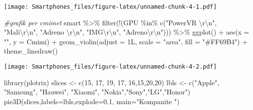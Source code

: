 \documentclass[
]{article}
\newenvironment{Shaded}{\begin{snugshade}}{\end{snugshade}}
\newcommand{\AttributeTok}[1]{\textcolor[rgb]{0.77,0.63,0.00}{#1}}
\newcommand{\CommentTok}[1]{\textcolor[rgb]{0.56,0.35,0.01}{\textit{#1}}}
\newcommand{\DecValTok}[1]{\textcolor[rgb]{0.00,0.00,0.81}{#1}}
\newcommand{\FloatTok}[1]{\textcolor[rgb]{0.00,0.00,0.81}{#1}}
\newcommand{\FunctionTok}[1]{\textcolor[rgb]{0.00,0.00,0.00}{#1}}
\newcommand{\NormalTok}[1]{#1}
\newcommand{\OtherTok}[1]{\textcolor[rgb]{0.56,0.35,0.01}{#1}}
\newcommand{\SpecialCharTok}[1]{\textcolor[rgb]{0.00,0.00,0.00}{#1}}
\newcommand{\StringTok}[1]{\textcolor[rgb]{0.31,0.60,0.02}{#1}}
\begin{document}
\texttt{[image: Smartphones\_files/figure-latex/unnamed-chunk-4-1.pdf]}

\begin{Shaded}
\begin{Highlighting}[]
\CommentTok{\#grafik per cmimet}
\NormalTok{smart }\SpecialCharTok{\%\textgreater{}\%}
 \FunctionTok{filter}\NormalTok{(}\SpecialCharTok{!}\NormalTok{(GPU }\SpecialCharTok{\%in\%} \FunctionTok{c}\NormalTok{(}\StringTok{"PowerVR }\SpecialCharTok{\textbackslash{}r\textbackslash{}n}\StringTok{"}\NormalTok{, }\StringTok{"Mali}\SpecialCharTok{\textbackslash{}r\textbackslash{}n}\StringTok{"}\NormalTok{, }\StringTok{"Adreno }\SpecialCharTok{\textbackslash{}r\textbackslash{}n}\StringTok{"}\NormalTok{, }\StringTok{"IMG}\SpecialCharTok{\textbackslash{}r\textbackslash{}n}\StringTok{"}\NormalTok{, }\StringTok{"Adreno}\SpecialCharTok{\textbackslash{}r\textbackslash{}n}\StringTok{"}\NormalTok{))) }\SpecialCharTok{\%\textgreater{}\%}
 \FunctionTok{ggplot}\NormalTok{() }\SpecialCharTok{+}
  \FunctionTok{aes}\NormalTok{(}\AttributeTok{x =} \StringTok{""}\NormalTok{, }\AttributeTok{y =}\NormalTok{ Cmimi) }\SpecialCharTok{+}
  \FunctionTok{geom\_violin}\NormalTok{(}\AttributeTok{adjust =}\NormalTok{ 1L, }\AttributeTok{scale =} \StringTok{"area"}\NormalTok{, }\AttributeTok{fill =} \StringTok{"\#FF69B4"}\NormalTok{) }\SpecialCharTok{+}
  \FunctionTok{theme\_linedraw}\NormalTok{()}
\end{Highlighting}
\end{Shaded}

\texttt{[image: Smartphones\_files/figure-latex/unnamed-chunk-4-2.pdf]}

\begin{Shaded}
\begin{Highlighting}[]
\FunctionTok{library}\NormalTok{(plotrix)}
\NormalTok{slices }\OtherTok{\textless{}{-}} \FunctionTok{c}\NormalTok{(}\DecValTok{15}\NormalTok{, }\DecValTok{17}\NormalTok{, }\DecValTok{19}\NormalTok{, }\DecValTok{17}\NormalTok{, }\DecValTok{16}\NormalTok{,}\DecValTok{15}\NormalTok{,}\DecValTok{20}\NormalTok{,}\DecValTok{20}\NormalTok{)}
\NormalTok{lbls }\OtherTok{\textless{}{-}} \FunctionTok{c}\NormalTok{(}\StringTok{"Apple"}\NormalTok{, }\StringTok{"Samsung"}\NormalTok{, }\StringTok{"Hauwei"}\NormalTok{, }\StringTok{"Xiaomi"}\NormalTok{, }\StringTok{"Nokia"}\NormalTok{,}\StringTok{"Sony"}\NormalTok{,}\StringTok{"LG"}\NormalTok{,}\StringTok{"Honor"}\NormalTok{)}
\FunctionTok{pie3D}\NormalTok{(slices,}\AttributeTok{labels=}\NormalTok{lbls,}\AttributeTok{explode=}\FloatTok{0.1}\NormalTok{,}
   \AttributeTok{main=}\StringTok{"Kompanite "}\NormalTok{)}
\end{Highlighting}
\end{Shaded}
\end{document}
